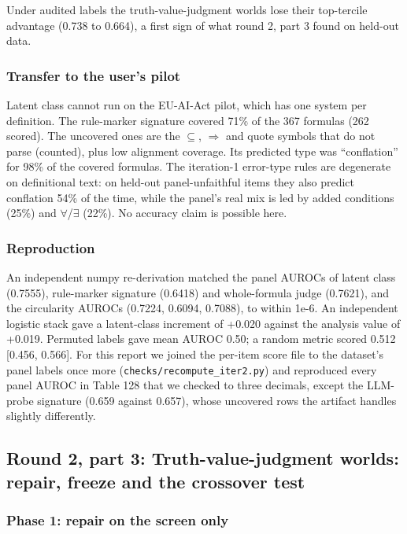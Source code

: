 \documentclass[11pt,letterpaper]{article}
\begin{document}
Under audited labels the truth-value-judgment worlds lose their top-tercile advantage (0.738 to 0.664), a first sign of what round 2, part 3 found on held-out data.

\subsubsection{Transfer to the user's pilot}

Latent class cannot run on the EU-AI-Act pilot, which has one system per definition. The rule-marker signature covered 71\% of the 367 formulas (262 scored). The uncovered ones are the \texttt{$\subseteq$}, \texttt{$\Rightarrow$} and quote symbols that do not parse (counted), plus low alignment coverage. Its predicted type was ``conflation'' for 98\% of the covered formulas. The iteration-1 error-type rules are degenerate on definitional text: on held-out panel-unfaithful items they also predict conflation 54\% of the time, while the panel's real mix is led by added conditions (25\%) and $\forall$/$\exists$ (22\%). No accuracy claim is possible here.

\subsubsection{Reproduction}

An independent numpy re-derivation matched the panel AUROCs of latent class (0.7555), rule-marker signature (0.6418) and whole-formula judge (0.7621), and the circularity AUROCs (0.7224, 0.6094, 0.7088), to within 1e-6. An independent logistic stack gave a latent-class increment of +0.020 against the analysis value of +0.019. Permuted labels gave mean AUROC 0.50; a random metric scored 0.512 [0.456, 0.566]. For this report we joined the per-item score file to the dataset's panel labels once more (\texttt{checks/\allowbreak{}recompute\_\allowbreak{}\allowbreak{}iter2.py}) and reproduced every panel AUROC in Table 128 that we checked to three decimals, except the LLM-probe signature (0.659 against 0.657), whose uncovered rows the artifact handles slightly differently.

\subsection{Round 2, part 3: Truth-value-judgment worlds: repair, freeze and the crossover test}

\subsubsection{Phase 1: repair on the screen only}
\end{document}

